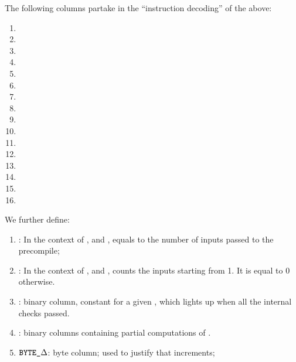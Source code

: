 The following columns partake in the ``instruction decoding'' of the above:
\begin{multicols}{2}
      \begin{enumerate}
        \item \isPointEvaluationData
        \item \isPointEvaluationResult

        \item \isBlsGOneAddData             
        \item \isBlsGOneAddResult           
             
        \item \isBlsGOneMsmData             
        \item \isBlsGOneMsmResult 

        \item \isBlsGTwoAddData             
        \item \isBlsGTwoAddResult   

        \item \isBlsGTwoMsmData
        \item \isBlsGTwoMsmResult

        \item \isBlsPairingCheckData
        \item \isBlsPairingCheckResult          
      
        \item \isBlsMapFpToGOneData         
        \item \isBlsMapFpToGOneResult       
      
        \item \isBlsMapFpTwoToGTwoData         
        \item \isBlsMapFpTwoToGTwoResult
      \end{enumerate}
\end{multicols}

We further define: 

\begin{enumerate}[resume]
  \item \totalInputs:
        In the context of ,  and , equals to the number of inputs passed to the precompile;
  \item \accInputs: In the context of ,  and , counts the inputs starting from 1. It is equal to 0 otherwise.
  \item \both{\internalChecksPassed}:
        binary column, constant for a given \blsId, which lights up when all the internal checks passed.
  \item \both{\partialComputations}:
        binary columns containing partial computations of \internalChecksPassed{}.
  \item $\texttt{BYTE}\texttt{\_$\Delta$}$:
        byte column; used to justify that \blsId{} increments;
\end{enumerate}

